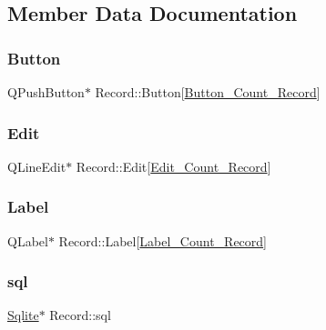 \subsection{Member Data Documentation}
\mbox{\label{class_record_a5fa1d68f3e8af5da355a3d4ac4340876}} 
\subsubsection{\texorpdfstring{Button}{Button}}
{\footnotesize\ttfamily Q\+Push\+Button$\ast$ Record\+::\+Button\mbox{[}\mbox{\hyperlink{record_8h_a4d319c985ecf15ec7ce151eea6e5f25e}{Button\+\_\+\+Count\+\_\+\+Record}}\mbox{]}\hspace{0.3cm}{\ttfamily [private]}}

\mbox{\label{class_record_ae969d53f57dbc379816588b35c17e58f}} 
\subsubsection{\texorpdfstring{Edit}{Edit}}
{\footnotesize\ttfamily Q\+Line\+Edit$\ast$ Record\+::\+Edit\mbox{[}\mbox{\hyperlink{record_8h_a02fbceef67a55fc0f21a7b2516ff47b3}{Edit\+\_\+\+Count\+\_\+\+Record}}\mbox{]}\hspace{0.3cm}{\ttfamily [private]}}

\mbox{\label{class_record_a63bd65b95f9c397e2fb7102fae2dbb4b}} 
\subsubsection{\texorpdfstring{Label}{Label}}
{\footnotesize\ttfamily Q\+Label$\ast$ Record\+::\+Label\mbox{[}\mbox{\hyperlink{record_8h_add5f3d7c7526d68cc7cff1d173adf1a1}{Label\+\_\+\+Count\+\_\+\+Record}}\mbox{]}\hspace{0.3cm}{\ttfamily [private]}}

\mbox{\label{class_record_ab108613bccbe5871d86f87802689e8ad}} 
\subsubsection{\texorpdfstring{sql}{sql}}
{\footnotesize\ttfamily \mbox{\hyperlink{class_sqlite}{Sqlite}}$\ast$ Record\+::sql\hspace{0.3cm}{\ttfamily [private]}}

